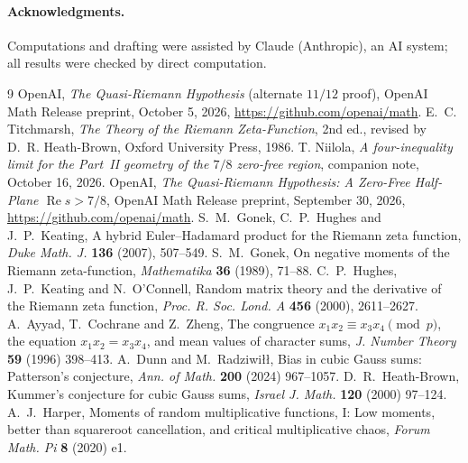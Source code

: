 \documentclass[11pt]{article}
\theoremstyle{remark}
\begin{document}
\paragraph{Acknowledgments.} Computations and drafting were assisted by Claude (Anthropic),
an AI system; all results were checked by direct computation.

\begin{thebibliography}{9}
 OpenAI, \emph{The Quasi-Riemann Hypothesis} (alternate $11/12$ proof),
OpenAI Math Release preprint, October 5, 2026,
\url{https://github.com/openai/math}.
 E.~C. Titchmarsh, \emph{The Theory of the Riemann Zeta-Function}, 2nd ed.,
revised by D.~R. Heath-Brown, Oxford University Press, 1986.
 T. Niilola, \emph{A four-inequality limit for the Part~II geometry of the $7/8$
zero-free region}, companion note, October 16, 2026.
 OpenAI, \emph{The Quasi-Riemann Hypothesis: A Zero-Free Half-Plane
$\operatorname{Re}s>7/8$}, OpenAI Math Release preprint, September 30, 2026,
\url{https://github.com/openai/math}.
 S.~M.~Gonek, C.~P.~Hughes and J.~P.~Keating, A hybrid Euler--Hadamard product
for the Riemann zeta function, \emph{Duke Math. J.} \textbf{136} (2007), 507--549.
 S.~M.~Gonek, On negative moments of the Riemann zeta-function,
\emph{Mathematika} \textbf{36} (1989), 71--88.
 C.~P.~Hughes, J.~P.~Keating and N.~O'Connell, Random matrix theory and the
derivative of the Riemann zeta function, \emph{Proc. R. Soc. Lond. A} \textbf{456} (2000),
2611--2627.
 A.~Ayyad, T.~Cochrane and Z.~Zheng, The congruence $x_1x_2\equiv x_3x_4
\pmod p$, the equation $x_1x_2=x_3x_4$, and mean values of character sums,
\emph{J. Number Theory} \textbf{59} (1996) 398--413.
 A.~Dunn and M.~Radziwiłł, Bias in cubic Gauss sums: Patterson's conjecture,
\emph{Ann. of Math.} \textbf{200} (2024) 967--1057.
 D.~R.~Heath-Brown, Kummer's conjecture for cubic Gauss sums,
\emph{Israel J. Math.} \textbf{120} (2000) 97--124.
 A.~J.~Harper, Moments of random multiplicative functions, I: Low moments,
better than squareroot cancellation, and critical multiplicative chaos,
\emph{Forum Math. Pi} \textbf{8} (2020) e1.
\end{thebibliography}
\end{document}
